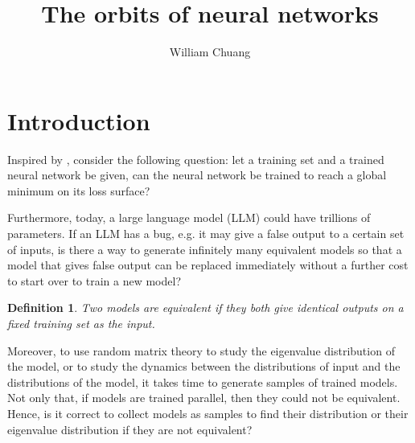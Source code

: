 \documentclass{article}
\theoremstyle{plain}
\theoremstyle{plain} %
\newtheorem{definition}[theorem]{Definition}
\theoremstyle{definition}  %
\theoremstyle{remark}  %
\theoremstyle{plain}
\begin{document}
\title{The orbits of neural networks}

\author{William Chuang}

\maketitle


\section{Introduction}
Inspired by \cite{yun2017global, blum1988training, judd1990neural}, consider the following question: 
let a training set and a trained neural network be given, can the neural network be trained to reach a global minimum on its loss surface? 




Furthermore, today, a large language model (LLM) could have trillions of parameters. If an LLM has a bug, e.g. it may give a false output to a certain set of inputs, is there a way to generate infinitely many equivalent models so that a model that gives false output can be replaced immediately without a further cost to start over to train a new model?

\begin{definition}
\textit{Two models are equivalent} if they both give identical outputs on a fixed training set as the input.
\end{definition}

Moreover, to use random matrix theory to study the eigenvalue distribution of the model, or to study the dynamics between the distributions of input and the distributions of the model, it takes time to generate samples of trained models. Not only that, if models are trained parallel, then they could not be equivalent. Hence, is it correct to collect models as samples to find their distribution or their eigenvalue distribution if they are not equivalent? 
\end{document}
